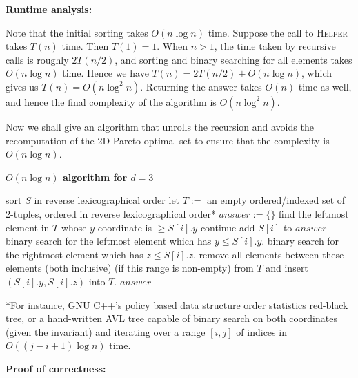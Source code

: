 \documentclass[answers]{exam}
\begin{document}
\begin{questions}
\begin{solution}
    \textbf{Runtime analysis:}

    Note that the initial sorting takes $O(n \log n)$ time. Suppose the call to \textsc{Helper} takes $T(n)$ time. Then $T(1) = 1$. When $n > 1$, the time taken by recursive calls is
    roughly $2T(n / 2)$, and sorting and binary searching for all elements takes $O(n \log n)$ time. Hence we have $T(n) = 2T(n / 2) + O(n \log n)$, which gives us $T(n) = O(n \log^2 n)$.
    Returning the answer takes $O(n)$ time as well, and hence the final complexity of the algorithm is $O(n \log^2 n)$.

    Now we shall give an algorithm that unrolls the recursion and avoids the recomputation of the 2D Pareto-optimal set to ensure that the complexity is $O(n \log n)$.

    \textbf{$O(n \log n)$ algorithm for $d = 3$}
    \begin{algorithmic}
            \State sort $S$ in reverse lexicographical order
            \State let $T := $ an empty ordered/indexed set of 2-tuples, ordered in reverse lexicographical order*
            \State {}
            \State $answer := \{\}$
                \State find the leftmost element in $T$ whose $y$-coordinate is $\ge S[i].y$
                    \State continue
                \EndIf
                \State add $S[i]$ to $answer$
                \State binary search for the leftmost element which has $y \le S[i].y$.
                \State binary search for the rightmost element which has $z \le S[i].z$.
                \State remove all elements between these elements (both inclusive) (if this range is non-empty) from $T$ and insert $(S[i].y, S[i].z)$ into $T$.
            \EndFor
            \State \Return $answer$
        \EndFunction
    \end{algorithmic}

    *For instance, GNU C++'s policy based data structure order statistics red-black tree, or a hand-written AVL tree capable of binary search on both coordinates (given the invariant) and iterating over a range $[i, j]$ of indices in
    $O((j-i+1)\log n)$ time.

    \textbf{Proof of correctness:}


\end{solution}
\end{questions}
\end{document}
